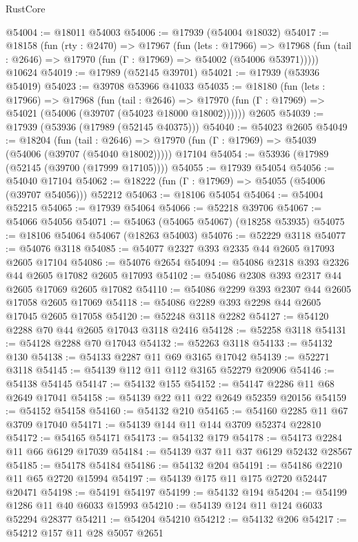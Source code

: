 \begin{lexlean}{RustCore}
\begin{coremodule}
@54004 := @18011 @54003
@54006 := @17939 (@54004 @18032)
@54017 := @18158
    (fun (rty : @2470) =>
    @17967
      (fun (lets : @17966) =>
      @17968 (fun (tail : @2646) => @17970 (fun (Γ : @17969) => @54002 (@54006 @53971)))))
    @10624
@54019 := @17989 (@52145 @39701)
@54021 := @17939 (@53936 @54019)
@54023 := @39708 @53966 @41033
@54035 := @18180
    (fun (lets : @17966) =>
    @17968
      (fun (tail : @2646) =>
      @17970 (fun (Γ : @17969) => @54021 (@54006 (@39707 (@54023 @18000 @18002))))))
    @2605
@54039 := @17939 (@53936 (@17989 (@52145 @40375)))
@54040 := @54023 @2605
@54049 := @18204
    (fun (tail : @2646) => @17970 (fun (Γ : @17969) => @54039 (@54006 (@39707 (@54040 @18002)))))
    @17104
@54054 := @53936 (@17989 (@52145 (@39700 (@17999 @17105))))
@54055 := @17939 @54054
@54056 := @54040 @17104
@54062 := @18222 (fun (Γ : @17969) => @54055 (@54006 (@39707 @54056))) @52212
@54063 := @18106 @54054
@54064 := @54004 @52215
@54065 := @17939 @54064
@54066 := @52218 @39706
@54067 := @54066 @54056
@54071 := @54063 (@54065 @54067) (@18258 @53935)
@54075 := @18106 @54064 @54067 (@18263 @54003)
@54076 := @52229 @3118
@54077 := @54076 @3118
@54085 := @54077 @2327 @393 @2335 @44 @2605 @17093 @2605 @17104
@54086 := @54076 @2654
@54094 := @54086 @2318 @393 @2326 @44 @2605 @17082 @2605 @17093
@54102 := @54086 @2308 @393 @2317 @44 @2605 @17069 @2605 @17082
@54110 := @54086 @2299 @393 @2307 @44 @2605 @17058 @2605 @17069
@54118 := @54086 @2289 @393 @2298 @44 @2605 @17045 @2605 @17058
@54120 := @52248 @3118 @2282
@54127 := @54120 @2288 @70 @44 @2605 @17043 @3118 @2416
@54128 := @52258 @3118
@54131 := @54128 @2288 @70 @17043
@54132 := @52263 @3118
@54133 := @54132 @130
@54138 := @54133 @2287 @11 @69 @3165 @17042
@54139 := @52271 @3118
@54145 := @54139 @112 @11 @112 @3165 @52279 @20906
@54146 := @54138 @54145
@54147 := @54132 @155
@54152 := @54147 @2286 @11 @68 @2649 @17041
@54158 := @54139 @22 @11 @22 @2649 @52359 @20156
@54159 := @54152 @54158
@54160 := @54132 @210
@54165 := @54160 @2285 @11 @67 @3709 @17040
@54171 := @54139 @144 @11 @144 @3709 @52374 @22810
@54172 := @54165 @54171
@54173 := @54132 @179
@54178 := @54173 @2284 @11 @66 @6129 @17039
@54184 := @54139 @37 @11 @37 @6129 @52432 @28567
@54185 := @54178 @54184
@54186 := @54132 @204
@54191 := @54186 @2210 @11 @65 @2720 @15994
@54197 := @54139 @175 @11 @175 @2720 @52447 @20471
@54198 := @54191 @54197
@54199 := @54132 @194
@54204 := @54199 @1286 @11 @40 @6033 @15993
@54210 := @54139 @124 @11 @124 @6033 @52294 @28377
@54211 := @54204 @54210
@54212 := @54132 @206
@54217 := @54212 @157 @11 @28 @5057 @2651

\end{coremodule}
\end{lexlean}
